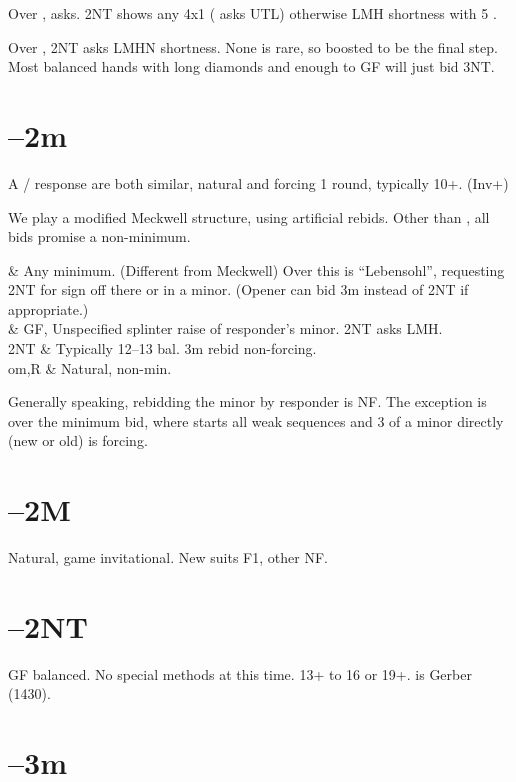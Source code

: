 \documentclass[tom-jenni]{subfiles}
\begin{document}
Over ,  asks. 2NT shows any 4x1 ( asks UTL) otherwise LMH shortness with 5 \ccc.

Over , 2NT asks LMHN shortness.  None is rare, so boosted to be the final step.  Most balanced hands with long diamonds and enough to GF will just bid 3NT.

\section[1D--2m]{--2m}

A / response are both similar, natural and forcing 1 round, typically 10+. (Inv+)

We play a modified Meckwell structure, using artificial rebids. Other than , all bids promise a non-minimum.

\begin{bidtable}{}
	 & Any minimum. (Different from Meckwell) Over this  is ``Lebensohl'', requesting 2NT for sign off there or in a minor. (Opener can bid 3m instead of 2NT if appropriate.) \\
	 & GF, Unspecified splinter raise of responder's minor. 2NT asks LMH. \\
	2NT & Typically 12--13 bal. 3m rebid non-forcing. \\
	om,R &  Natural, non-min. \\
\end{bidtable}

Generally speaking, rebidding the minor by responder is NF. The exception is over the  minimum bid, where  starts all weak sequences and 3 of a minor directly (new or old) is forcing.

\section[1D--2M]{--2M}

Natural, game invitational.  New suits F1, other NF.

\section[1D--2NT]{--2NT}

GF balanced. No special methods at this time. 13+ to 16 or 19+.   is Gerber (1430).

\section[1D--3m]{--3m}
\end{document}
